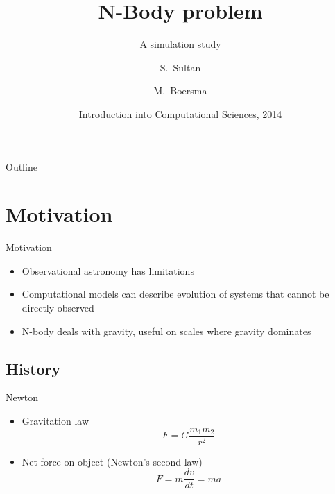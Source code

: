 \documentclass{beamer}
\title[] %
{N-Body problem}
\subtitle
{A simulation study}
\author[S. Sultan, M. Boersma] %
{S.~Sultan\inst{1} \and M.~Boersma\inst{1} }
\institute[Universities of Amsterdam] %
{
  \inst{1}%
  Department of Computational Science\\
  University of Amsterdam
 }
\date[CFP 2003] %
{Introduction into Computational Sciences, 2014}
\begin{document}
\begin{frame}
  \titlepage
\end{frame}

\begin{frame}{Outline}
  \tableofcontents
\end{frame}





\section{Motivation}

\begin{frame}{Motivation}
	\begin{itemize}
		\item
			Observational astronomy has limitations
		\item
			Computational models can describe evolution of systems that cannot be directly observed
		\item
			N-body deals with gravity, useful on scales where gravity dominates
	\end{itemize}
\end{frame}


\subsection{History}

\begin{frame}{Newton}
	\begin{itemize}
		\item
			Gravitation law \begin{equation} F = G \frac{m_1m_2}{r^2}\end{equation}
		\item 
        Net force on object (Newton's second law) \begin{equation} F = m \frac{dv}{dt} = ma \end{equation}
	\end{itemize}
\end{frame}
\end{document}
